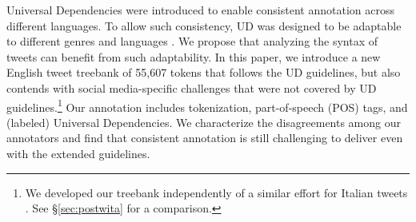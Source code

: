 \documentclass[11pt,a4paper]{article}
\begin{document}

Universal Dependencies \citep[UD]{NIVRE16.348} were introduced to enable
consistent annotation across different languages. To allow such
consistency, UD was designed to be adaptable to different genres \cite{wang-EtAl:2017:Long6} 
and languages \cite{guo-EtAl:2015:ACL-IJCNLP2,TACL892}. We propose that analyzing
the syntax of tweets can benefit from such adaptability. In this paper,
we introduce a new English tweet treebank of 55,607 tokens that follows the UD
guidelines, but also contends with social media-specific challenges that were not
covered by UD guidelines.\footnote{We developed our treebank independently of a similar effort for Italian tweets \cite{sanguinetti-17}. 
See \S\ref{sec:postwita} for a comparison.} Our annotation includes 
tokenization, part-of-speech (POS) tags, and (labeled) Universal Dependencies.
We characterize the disagreements among our annotators and find that
consistent annotation is still challenging to deliver even with
the extended guidelines.

\end{document}
